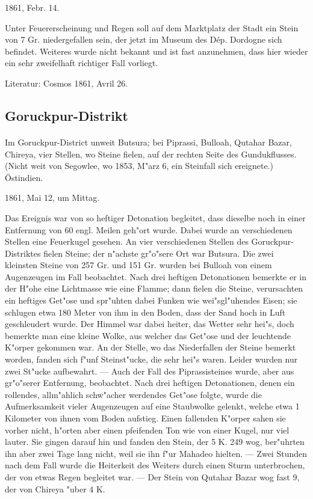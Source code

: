 \documentclass[a4paper, 11pt, oneside]{article}
\begin{document}
1861, Febr. 14.

Unter Feuererscheinung und Regen soll auf dem Marktplatz der Stadt ein Stein von 7 Gr. niedergefallen sein, der jetzt im Museum des Dép. Dordogne sich befindet. Weiteres wurde nicht bekannt und ist fast anzunehmen, dass hier wieder ein sehr zweifelhaft richtiger Fall vorliegt.

Literatur: Cosmos 1861, Avril 26.

\subsection{Goruckpur-Distrikt}
\normalsize
\paragraph{}
Im Goruckpur-District unweit Butsura; bei Piprassi, Bulloah, Qutahar Bazar, Chireya, vier Stellen, wo Steine fielen, auf der rechten Seite des Gundukflusses. (Nicht weit von Segowlee, wo 1853, M"arz 6, ein Steinfall sich ereignete.) Östindien.

1861, Mai 12, um Mittag.

Das Ereignis war von so heftiger Detonation begleitet, dass dieselbe noch in einer Entfernung von 60 engl. Meilen geh"ort wurde. Dabei wurde an verschiedenen Stellen eine Feuerkugel gesehen. An vier verschiedenen Stellen des Goruckpur-Distriktes fielen Steine; der n"achste gr"o"sere Ort war Butsura. Die zwei kleinsten Steine von 257 Gr. und 151 Gr. wurden bei Bulloah von einem Augenzeugen im Fall beobachtet. Nach drei heftigen Detonationen bemerkte er in der H"ohe eine Lichtmasse wie eine Flamme; dann fielen die Steine, verursachten ein heftiges Get"ose und spr"uhten dabei Funken wie wei"sgl"uhendes Eisen; sie schlugen etwa 180 Meter von ihm in den Boden, dass der Sand hoch in Luft geschleudert wurde. Der Himmel war dabei heiter, das Wetter sehr hei"s, doch bemerkte man eine kleine Wolke, aus welcher das Get"ose und der leuchtende K"orper gekommen war. An der Stelle, wo das Niederfallen der Steine bemerkt worden, fanden sich f"unf Steinst"ucke, die sehr hei"s waren. Leider wurden nur zwei St"ucke aufbewahrt. --- Auch der Fall des Piprassisteines wurde, aber aus gr"o"serer Entfernung, beobachtet. Nach drei heftigen Detonationen, denen ein rollendes, allm"ahlich schw"acher werdendes Get"ose folgte, wurde die Aufmerksamkeit vieler Augenzeugen auf eine Staubwolke gelenkt, welche etwa 1 Kilometer von ihnen vom Boden aufstieg. Einen fallenden K"orper sahen sie vorher nicht, h"orten aber einen pfeifenden Ton wie von einer Kugel, nur viel lauter. Sie gingen darauf hin und fanden den Stein, der 5 K. 249 wog, ber"uhrten ihn aber zwei Tage lang nicht, weil sie ihn f"ur Mahadeo hielten. --- Zwei Stunden nach dem Fall wurde die Heiterkeit des Weiters durch einen Sturm unterbrochen, der von etwas Regen begleitet war. --- Der Stein von Qutahar Bazar wog fast 9, der von Chireya "uber 4 K.
\end{document}
